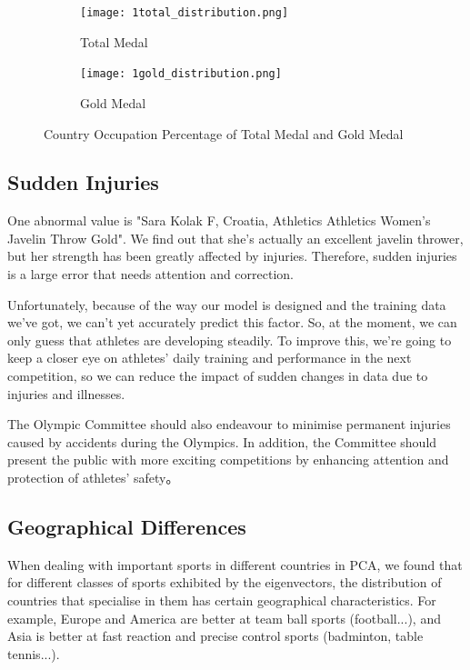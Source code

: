 \documentclass{mcmthesis}
\begin{document}
\begin{figure}
    \centering
        \begin{subfigure}[b]{0.4\textwidth}
        \texttt{[image: 1total\_distribution.png]}
        \caption{Total Medal}
        \label{fig:1total_distribution}
    \end{subfigure}
    \hfill
    \begin{subfigure}[b]{0.4\textwidth}
        \texttt{[image: 1gold\_distribution.png]}
        \caption{Gold Medal}
        \label{fig:1gold_distribution}
    \end{subfigure}
    \caption{Country Occupation Percentage of Total Medal and Gold Medal}
\end{figure}

\subsection{Sudden Injuries}
One abnormal value is "Sara Kolak F, Croatia, Athletics Athletics Women's Javelin Throw Gold"\cite{10}. We find out that she's actually an excellent javelin thrower, but her strength has been greatly affected by injuries. Therefore, sudden injuries is a large error that needs attention and correction. 

Unfortunately, because of the way our model is designed and the training data we've got, we can't yet accurately predict this factor. So, at the moment, we can only guess that athletes are developing steadily. To improve this, we're going to keep a closer eye on athletes' daily training and performance in the next competition, so we can reduce the impact of sudden changes in data due to injuries and illnesses.

The Olympic Committee should also endeavour to minimise permanent injuries caused by accidents during the Olympics. In addition, the Committee should present the public with more exciting competitions by enhancing attention and protection of athletes' safety。

\subsection{Geographical Differences}
When dealing with important sports in different countries in PCA, we found that for different classes of sports exhibited by the eigenvectors, the distribution of countries that specialise in them has certain geographical characteristics. For example, Europe and America are better at team ball sports (football...), and Asia is better at fast reaction and precise control sports (badminton, table tennis...).
\end{document}
